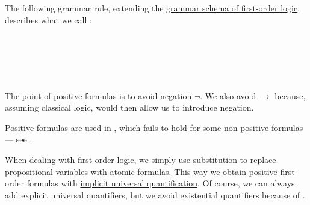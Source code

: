 \begin{definition}\label{def:positive_formula}
  The following grammar rule, extending the \hyperref[def:first_order_syntax/grammar_schema]{grammar schema of first-order logic}, describes what we call :
  \begin{bnf*}
     {\bnftsq{\( \top \)} \bnfor} \\
     \\
     \\
     \\
  \end{bnf*}
\end{definition}
\begin{comments}
  \item The point of positive formulas is to avoid \hyperref[def:propositional_language/negation]{negation \( \neg \)}. We also avoid \( \rightarrow \) because, assuming classical logic,  would then allow us to introduce negation.

  \item Positive formulas are used in , which fails to hold for some non-positive formulas --- see .

  \item When dealing with first-order logic, we simply use \hyperref[thm:first_order_substitution_equivalence/propositional]{substitution} to replace propositional variables with atomic formulas. This way we obtain positive first-order formulas with \hyperref[thm:implicit_universal_quantification]{implicit universal quantification}. Of course, we can always add explicit universal quantifiers, but we avoid existential quantifiers because of .
\end{comments}

